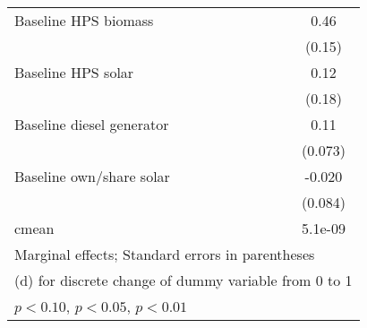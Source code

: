 \begin{table}[htbp]
\begin{tabular*}{1\hsize}{@{\hskip\tabcolsep\extracolsep\fill}l*{5}{c}}
Baseline HPS biomass&                  &                  &                  &                  &     0.46\sym{***}\\
                &                  &                  &                  &                  &   (0.15)         \\
Baseline HPS solar&                  &                  &                  &                  &     0.12         \\
                &                  &                  &                  &                  &   (0.18)         \\
Baseline diesel generator&                  &                  &                  &                  &     0.11         \\
                &                  &                  &                  &                  &  (0.073)         \\
Baseline own/share solar&                  &                  &                  &                  &   -0.020         \\
                &                  &                  &                  &                  &  (0.084)         \\
\midrule
cmean           &                  &                  &                  &                  &  5.1e-09         \\
\bottomrule
\multicolumn{6}{l}{\footnotesize Marginal effects; Standard errors in parentheses}\\
\multicolumn{6}{l}{\footnotesize  (d) for discrete change of dummy variable from 0 to 1}\\
\multicolumn{6}{l}{\footnotesize \sym{*} \(p<0.10\), \sym{**} \(p<0.05\), \sym{***} \(p<0.01\)}\\
\end{tabular*}
\end{table}
